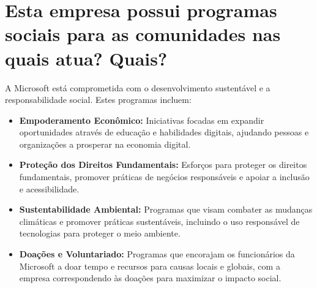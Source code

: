 \section{Esta empresa possui programas sociais para as comunidades nas quais atua? Quais?}
A Microsoft está comprometida com o desenvolvimento sustentável e a responsabilidade social. Estes programas incluem:

\begin{itemize}
    \item \textbf{Empoderamento Econômico:} Iniciativas focadas em expandir oportunidades através de educação e habilidades digitais, ajudando pessoas e organizações a prosperar na economia digital.
    \item \textbf{Proteção dos Direitos Fundamentais:} Esforços para proteger os direitos fundamentais, promover práticas de negócios responsáveis e apoiar a inclusão e acessibilidade.
    \item \textbf{Sustentabilidade Ambiental:} Programas que visam combater as mudanças climáticas e promover práticas sustentáveis, incluindo o uso responsável de tecnologias para proteger o meio ambiente.
    \item \textbf{Doações e Voluntariado:} Programas que encorajam os funcionários da Microsoft a doar tempo e recursos para causas locais e globais, com a empresa correspondendo às doações para maximizar o impacto social.
\end{itemize}
